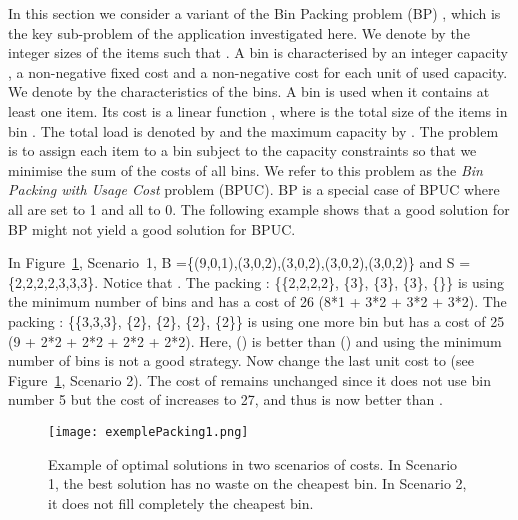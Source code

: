 
In this section we consider a  variant of the Bin Packing problem (BP)  \cite{Srikantaiah:2008},  which is the key sub-problem of the application  investigated here. 
We denote by  the integer sizes of the  items such that . A bin  is characterised by an integer capacity , a non-negative fixed cost  and a  non-negative  cost  for each unit of used capacity. We denote by  the characteristics of the  bins. A bin is used when it contains at least one item. Its cost is a linear function , where  is  the total size of the items  in bin . The total load  is denoted by  and the maximum capacity by . The problem is to assign each item to a bin subject to the capacity constraints so that we minimise  the sum of the costs of all bins. We refer to this problem as the \emph{Bin Packing with Usage Cost} problem (BPUC).
BP  is a special case of BPUC where all  are set to 1 and all  to 0. The following example shows that a good solution for BP might not yield a good solution for  BPUC. 


\begin{example}\label{ex1} In Figure~\ref{example1}, Scenario~1,   B =\{(9,0,1),(3,0,2),(3,0,2),(3,0,2),(3,0,2)\} and S = \{2,2,2,2,3,3,3\}. Notice that . The packing  : \{\{2,2,2,2\}, \{3\}, \{3\}, \{3\}, \{\}\} is using the minimum number of bins and has a  cost of 26 (8*1 + 3*2 + 3*2 + 3*2). The packing : \{\{3,3,3\}, \{2\}, \{2\}, \{2\}, \{2\}\} is using one more bin but has a  cost of 25 (9 + 2*2 + 2*2 + 2*2 + 2*2). Here, () is better than () and using the minimum number of bins is not a good strategy. 
Now  change the last unit cost to  (see Figure~\ref{example1}, Scenario 2). The cost of  remains unchanged since it does not use bin number 5 but the cost of  increases to 27, and thus   is now better than .
\end{example}
\begin{figure}[h]
\centering
\texttt{[image: exemplePacking1.png]}
\caption{Example of optimal solutions in two scenarios of costs. In Scenario 1, the best solution has no waste on the cheapest bin. In Scenario 2, it does not fill completely the cheapest bin.}
\label{example1}
\end{figure}

